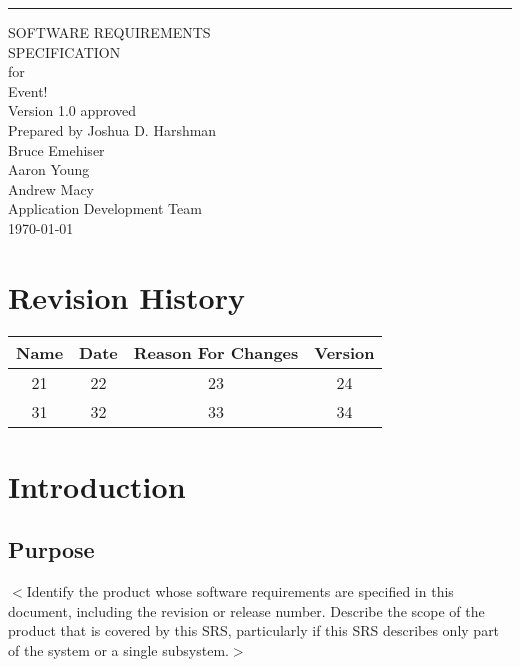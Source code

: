 \documentclass{scrreprt}
\date{}
\def\myversion{1.0 }
\begin{document}
\begin{flushright}
    \rule{16cm}{5pt}\vskip1cm
    \begin{bfseries}
        \Huge{SOFTWARE REQUIREMENTS\\ SPECIFICATION}\\
        \vspace{1.9cm}
        for\\
        \vspace{1.9cm}
        Event!\\
        \vspace{1.9cm}
        \LARGE{Version \myversion approved}\\
        \vspace{1.9cm}
        Prepared by Joshua D. Harshman\\Bruce Emehiser\\Aaron Young\\Andrew Macy\\
        \vspace{1.9cm}
        Application Development Team\\
        \vspace{1.9cm}
        \today\\
    \end{bfseries}
\end{flushright}

\tableofcontents


\chapter*{Revision History}

\begin{center}
    \begin{tabular}{|c|c|c|c|}
        \hline
	    Name & Date & Reason For Changes & Version\\
        \hline
	    21 & 22 & 23 & 24\\
        \hline
	    31 & 32 & 33 & 34\\
        \hline
    \end{tabular}
\end{center}

\chapter{Introduction}

\section{Purpose}
$<$Identify the product whose software requirements are specified in this 
document, including the revision or release number. Describe the scope of the 
product that is covered by this SRS, particularly if this SRS describes only 
part of the system or a single subsystem.$>$
\end{document}

